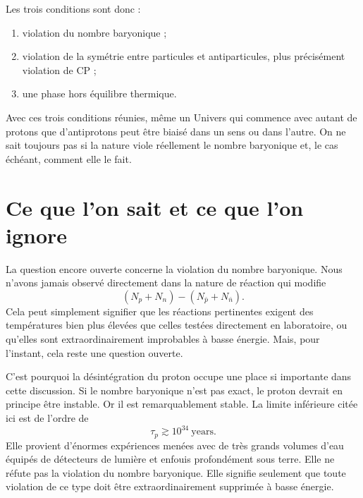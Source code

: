 Les trois conditions sont donc :
\begin{enumerate}
\item violation du nombre baryonique ;
\item violation de la symétrie entre particules et antiparticules, plus précisément violation de CP ;
\item une phase hors équilibre thermique.
\end{enumerate}

\begin{classroomqa}
\end{classroomqa}

Avec ces trois conditions réunies, même un Univers qui commence avec autant de protons que d’antiprotons peut être biaisé dans un sens ou dans l’autre. On ne sait toujours pas si la nature viole réellement le nombre baryonique et, le cas échéant, comment elle le fait.

\section{Ce que l’on sait et ce que l’on ignore}

La question encore ouverte concerne la violation du nombre baryonique. Nous n’avons jamais observé directement dans la nature de réaction qui modifie
\[
(N_p+N_n)-(N_{\bar p}+N_{\bar n}).
\]
Cela peut simplement signifier que les réactions pertinentes exigent des températures bien plus élevées que celles testées directement en laboratoire, ou qu’elles sont extraordinairement improbables à basse énergie. Mais, pour l’instant, cela reste une question ouverte.

C’est pourquoi la désintégration du proton occupe une place si importante dans cette discussion. Si le nombre baryonique n’est pas exact, le proton devrait en principe être instable. Or il est remarquablement stable. La limite inférieure citée ici est de l’ordre de
\[
\tau_p \gtrsim 10^{34}\ \text{years}.
\]
Elle provient d’énormes expériences menées avec de très grands volumes d’eau équipés de détecteurs de lumière et enfouis profondément sous terre. Elle ne réfute pas la violation du nombre baryonique. Elle signifie seulement que toute violation de ce type doit être extraordinairement supprimée à basse énergie.

